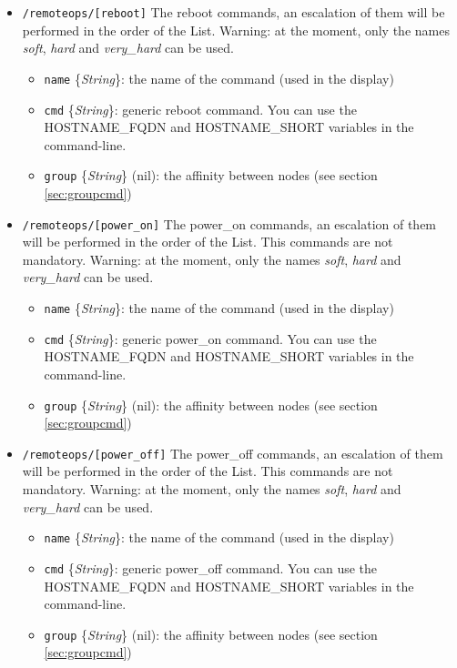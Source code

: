 \documentclass[a4wide,10pt,oneside]{book}
\newcommand{\ypath}[1]{\texttt{#1}}
\newcommand{\yfield}[2]{\texttt{#1} {\small\{{\emph{#2}}\}}:}
\newcommand{\yfieldd}[3]{\texttt{#1} {\small\{{\emph{#2}}\}} {\small(}#3{\small)}:}
\begin{document}
\begin{itemize}
  \item \ypath{/remoteops/[reboot]} The reboot commands, an escalation of them will be performed in the order of the List. Warning: at the moment, only the names \emph{soft}, \emph{hard} and \emph{very\_hard} can be used.
  \begin{itemize}
    \item \yfield{name}{String} the name of the command (used in the display)
    \item \yfield{cmd}{String} generic reboot command. You can use the HOSTNAME\_FQDN and HOSTNAME\_SHORT variables in the command-line.
    \item \yfieldd{group}{String}{nil} the affinity between nodes (see section \ref{sec:groupcmd})
  \end{itemize}

  \item \ypath{/remoteops/[power\_on]} The power\_on commands, an escalation of them will be performed in the order of the List. This commands are not mandatory. Warning: at the moment, only the names \emph{soft}, \emph{hard} and \emph{very\_hard} can be used.
  \begin{itemize}
    \item \yfield{name}{String} the name of the command (used in the display)
    \item \yfield{cmd}{String} generic power\_on command. You can use the HOSTNAME\_FQDN and HOSTNAME\_SHORT variables in the command-line.
    \item \yfieldd{group}{String}{nil} the affinity between nodes (see section \ref{sec:groupcmd})
  \end{itemize}

  \item \ypath{/remoteops/[power\_off]} The power\_off commands, an escalation of them will be performed in the order of the List. This commands are not mandatory. Warning: at the moment, only the names \emph{soft}, \emph{hard} and \emph{very\_hard} can be used.
  \begin{itemize}
    \item \yfield{name}{String} the name of the command (used in the display)
    \item \yfield{cmd}{String} generic power\_off command. You can use the HOSTNAME\_FQDN and HOSTNAME\_SHORT variables in the command-line.
    \item \yfieldd{group}{String}{nil} the affinity between nodes (see section \ref{sec:groupcmd})
  \end{itemize}


\end{itemize}
\end{document}
